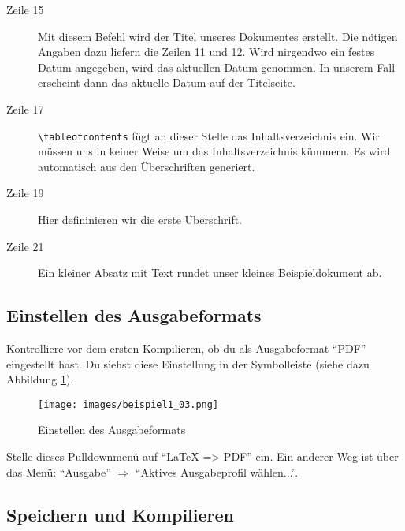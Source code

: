 \begin{description}
\item[Zeile 15] Mit diesem Befehl wird der Titel unseres Dokumentes erstellt. Die nötigen Angaben dazu liefern die Zeilen 11 und 12. Wird nirgendwo ein festes Datum angegeben, wird das aktuellen Datum genommen. In unserem Fall erscheint dann das aktuelle Datum auf der Titelseite.
\item[Zeile 17] \texttt{\textbackslash tableofcontents} fügt an dieser Stelle das Inhaltsverzeichnis ein. Wir müssen uns in keiner Weise um das Inhaltsverzeichnis kümmern. Es wird automatisch aus den Überschriften generiert.
\item[Zeile 19] Hier defininieren wir die erste Überschrift.
\item[Zeile 21] Ein kleiner Absatz mit Text rundet unser kleines Beispieldokument ab.
\end{description}

\subsection{Einstellen des Ausgabeformats}

Kontrolliere vor dem ersten Kompilieren, ob du als Ausgabeformat \enquote{PDF} eingestellt hast. Du siehst diese Einstellung in der Symbolleiste (siehe dazu Abbildung \ref{fig:beispiel1_03}).

\begin{figure}[ht]
	\begin{center}
		\texttt{[image: images/beispiel1\_03.png]}
	\end{center}
	\caption{Einstellen des Ausgabeformats}
	\label{fig:beispiel1_03}
\end{figure}

Stelle dieses Pulldownmenü auf \enquote{LaTeX => PDF} ein. Ein anderer Weg ist über das Menü: \enquote{Ausgabe} $\Rightarrow$ \enquote{Aktives Ausgabeprofil wählen...}.

\subsection{Speichern und Kompilieren}


